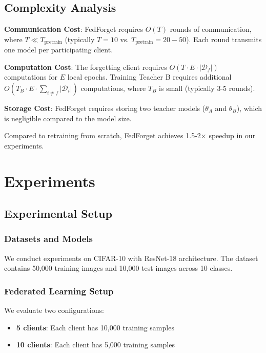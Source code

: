 \documentclass[10pt,twocolumn]{article}
\begin{document}
\subsection{Complexity Analysis}

\textbf{Communication Cost}: FedForget requires $O(T)$ rounds of communication, where $T \ll T_{\text{pretrain}}$ (typically $T=10$ vs. $T_{\text{pretrain}}=20-50$). Each round transmits one model per participating client.

\textbf{Computation Cost}: The forgetting client requires $O(T \cdot E \cdot |\mathcal{D}_f|)$ computations for $E$ local epochs. Training Teacher B requires additional $O(T_B \cdot E \cdot \sum_{i \neq f} |\mathcal{D}_i|)$ computations, where $T_B$ is small (typically 3-5 rounds).

\textbf{Storage Cost}: FedForget requires storing two teacher models ($\theta_A$ and $\theta_B$), which is negligible compared to the model size.

Compared to retraining from scratch, FedForget achieves 1.5-2× speedup in our experiments.

\section{Experiments}

\subsection{Experimental Setup}

\subsubsection{Datasets and Models}

We conduct experiments on CIFAR-10 with ResNet-18 architecture. The dataset contains 50,000 training images and 10,000 test images across 10 classes.

\subsubsection{Federated Learning Setup}

We evaluate two configurations:
\begin{itemize}
\item \textbf{5 clients}: Each client has 10,000 training samples
\item \textbf{10 clients}: Each client has 5,000 training samples
\end{itemize}
\end{document}
